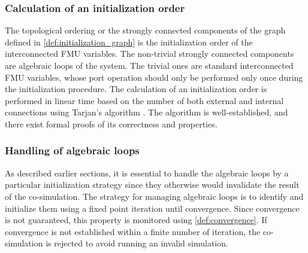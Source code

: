 
\subsubsection{Calculation of an initialization order}
The topological ordering or the strongly connected components of the graph defined in \cref{def:initialization_graph} is the initialization order of the interconnected FMU variables. 
The non-trivial strongly connected components are algebraic loops of the system. The trivial ones are standard interconnected FMU variables, whose port operation should only be performed only once during the initialization procedure.
The calculation of an initialization order is performed in linear time based on the number of both external and internal connections using Tarjan's algorithm \cite{tarjan_1972}. 
The algorithm is well-established, and there exist formal proofs of its correctness and properties\cite{stefanMerz}. 

\subsubsection{Handling of algebraic loops}
As described earlier sections, it is essential to handle the algebraic loops by a particular initialization strategy since they otherwise would invalidate the result of the co-simulation. The strategy for managing algebraic loops is to identify and initialize them using a fixed point iteration until convergence. Since convergence is not guaranteed, this property is monitored using \cref{def:convergence}. If convergence is not established within a finite number of iteration, the co-simulation is rejected to avoid running an invalid simulation.


